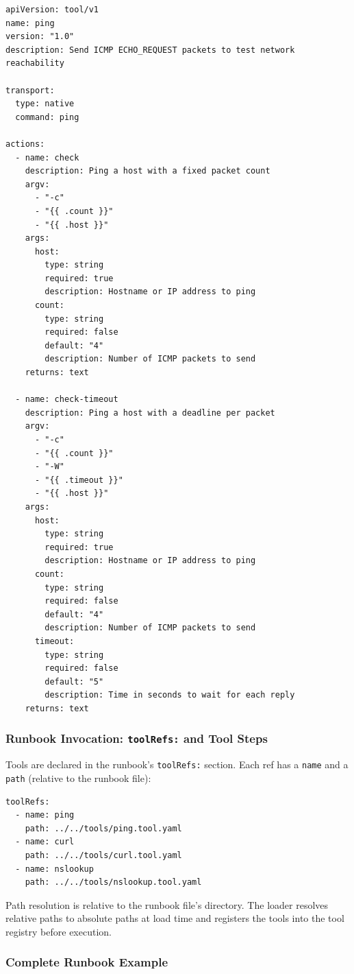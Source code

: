 \begin{verbatim}
apiVersion: tool/v1
name: ping
version: "1.0"
description: Send ICMP ECHO_REQUEST packets to test network reachability

transport:
  type: native
  command: ping

actions:
  - name: check
    description: Ping a host with a fixed packet count
    argv:
      - "-c"
      - "{{ .count }}"
      - "{{ .host }}"
    args:
      host:
        type: string
        required: true
        description: Hostname or IP address to ping
      count:
        type: string
        required: false
        default: "4"
        description: Number of ICMP packets to send
    returns: text

  - name: check-timeout
    description: Ping a host with a deadline per packet
    argv:
      - "-c"
      - "{{ .count }}"
      - "-W"
      - "{{ .timeout }}"
      - "{{ .host }}"
    args:
      host:
        type: string
        required: true
        description: Hostname or IP address to ping
      count:
        type: string
        required: false
        default: "4"
        description: Number of ICMP packets to send
      timeout:
        type: string
        required: false
        default: "5"
        description: Time in seconds to wait for each reply
    returns: text
\end{verbatim}

\subsubsection{Runbook Invocation: \texttt{toolRefs:} and Tool Steps}

Tools are declared in the runbook's \texttt{toolRefs:} section.  Each ref has a
\texttt{name} and a \texttt{path} (relative to the runbook file):

\begin{verbatim}
toolRefs:
  - name: ping
    path: ../../tools/ping.tool.yaml
  - name: curl
    path: ../../tools/curl.tool.yaml
  - name: nslookup
    path: ../../tools/nslookup.tool.yaml
\end{verbatim}

Path resolution is relative to the runbook file's directory.  The loader
resolves relative paths to absolute paths at load time and registers the tools
into the tool registry before execution.

\subsubsection{Complete Runbook Example}

